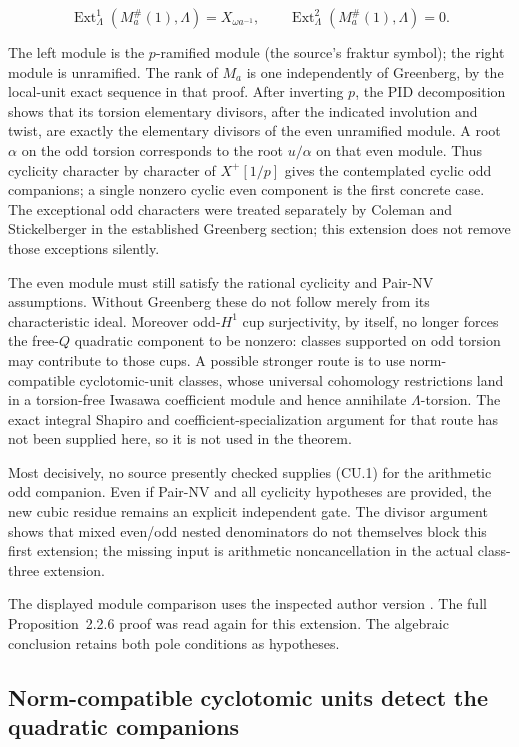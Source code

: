 \documentclass[11pt,a4paper]{article}
\theoremstyle{definition}
\begin{document}
\[
\operatorname{Ext}^1_\Lambda(M_a^\#(1),\Lambda)
   =X_{\omega a^{-1}},
\qquad
\operatorname{Ext}^2_\Lambda(M_a^\#(1),\Lambda)=0.
\]

The left module is the \(p\)-ramified module (the source's fraktur symbol); the right module is unramified. The rank of \(M_a\) is one independently of Greenberg, by the local-unit exact sequence in that proof. After inverting \(p\), the PID decomposition shows that its torsion elementary divisors, after the indicated involution and twist, are exactly the elementary divisors of the even unramified module. A root \(\alpha\) on the odd torsion corresponds to the root \(u/\alpha\) on that even module. Thus cyclicity character by character of \(X^+[1/p]\) gives the contemplated cyclic odd companions; a single nonzero cyclic even component is the first concrete case. The exceptional odd characters were treated separately by Coleman and Stickelberger in the established Greenberg section; this extension does not remove those exceptions silently.

The even module must still satisfy the rational cyclicity and Pair-NV assumptions. Without Greenberg these do not follow merely from its characteristic ideal. Moreover odd-\(H^1\) cup surjectivity, by itself, no longer forces the free-\(Q\) quadratic component to be nonzero: classes supported on odd torsion may contribute to those cups. A possible stronger route is to use norm-compatible cyclotomic-unit classes, whose universal cohomology restrictions land in a torsion-free Iwasawa coefficient module and hence annihilate \(\Lambda\)-torsion. The exact integral Shapiro and coefficient-specialization argument for that route has not been supplied here, so it is not used in the theorem.

Most decisively, no source presently checked supplies (CU.1) for the arithmetic odd companion. Even if Pair-NV and all cyclicity hypotheses are provided, the new cubic residue remains an explicit independent gate. The divisor argument shows that mixed even/odd nested denominators do not themselves block this first extension; the missing input is arithmetic noncancellation in the actual class-three extension.

The displayed module comparison uses the inspected author version \cite{WakeWangErickson2017}. The full Proposition~2.2.6 proof was read again for this extension. The algebraic conclusion retains both pole conditions as hypotheses.

\subsection{Norm-compatible cyclotomic units detect the quadratic companions}
\label{sec:universal-cyclotomic-pair}
\end{document}

